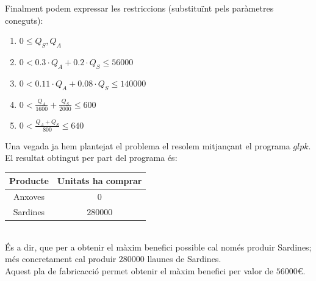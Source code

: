 \documentclass[a4paper, 11pt]{article}
\begin{document}
Finalment podem expressar les restriccions (substituïnt pels paràmetres coneguts):
\begin{enumerate}
    \item $ 0 \leq Q_S, Q_A $
    \item $ 0 < 0.3 \cdot Q_A + 0.2 \cdot Q_S \leq 56000 $
    \item $ 0 < 0.11 \cdot Q_A + 0.08 \cdot Q_S \leq 140000 $
    \item $0 < \frac{Q_A}{1600}  + \frac{Q_S}{2000} \leq 600$
    \item $0 < \frac{Q_A + Q_S}{800}  \leq 640 $
\end{enumerate}

\newpage
\hspace{-1.5em}Una vegada ja hem plantejat el problema el resolem mitjançant el programa $ glpk$.\\
El resultat obtingut per part del programa és:
\begin{table}[h]
    \centering
    \begin{tabular}{c|c}
        \textbf{Producte} & \textbf{Unitats ha comprar} \\ \hline
        Anxoves & $0$\\ \hline
        Sardines & $280000$\\ 
    \end{tabular}
\end{table}\\
És a dir, que per a obtenir el màxim benefici possible cal només produir Sardines; més concretament cal produir $280000$ llaunes de Sardines.\\
Aquest pla de fabricacció permet obtenir el màxim benefici per valor de $56000$\euro.
\end{document}
